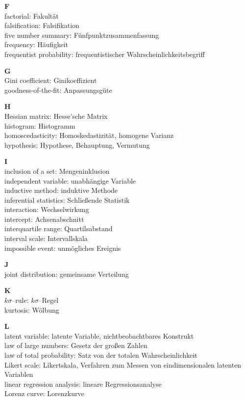 \medskip
\noindent
{\bf F}\\
factorial: Fakult\"{a}t\\
falsification: Falsifikation\\
five number summary: F\"{u}nfpunktzusammenfassung\\
frequency: H\"{a}ufigkeit\\
frequentist probability: frequentistischer 
Wahrscheinlichkeitsbegriff

\medskip
\noindent
{\bf G}\\
Gini coefficient: Ginikoeffizient\\
goodness-of-the-fit: Anpassungsg\"{u}te

\medskip
\noindent
{\bf H}\\
Hessian matrix: Hesse'sche Matrix\\
histogram: Histogramm\\
homoscedasticity: Homoskedastizit\"{a}t, homogene Varianz\\
hypothesis: Hypothese, Behauptung, Vermutung

\medskip
\noindent
{\bf I}\\
inclusion of a set: Mengeninklusion\\
independent variable: unabh\"{a}ngige Variable\\
inductive method: induktive Methode\\
inferential statistics: Schlie\ss ende Statistik\\
interaction: Wechselwirkung\\
intercept: Achsenabschnitt\\
interquartile range: Quartilsabstand\\
interval scale: Intervallskala\\
impossible event: unm\"{o}gliches Ereignis

\medskip
\noindent
{\bf J}\\
joint distribution: gemeinsame Verteilung

\medskip
\noindent
{\bf K}\\
$k\sigma$--rule: $k\sigma$--Regel\\
kurtosis: W\"{o}lbung

\medskip
\noindent
{\bf L}\\
latent variable: latente Variable, nichtbeobachtbares Konstrukt\\
law of large numbers: Gesetz der gro\ss en Zahlen\\
law of total probability: Satz von der totalen Wahrscheinlichkeit\\
Likert scale: Likertskala, Verfahren zum Messen von 
eindimensionalen latenten Variablen\\
linear regression analysis: lineare Regressionsanalyse\\
Lorenz curve: Lorenzkurve

